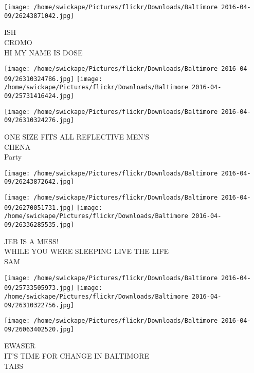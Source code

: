 \documentclass[10pt,letterpaper]{article}
\begin{document}
\vspace{0.25in}
\texttt{[image: /home/swickape/Pictures/flickr/Downloads/Baltimore 2016-04-09/26243871042.jpg]}

ISH\\
CROMO\\
HI MY NAME IS DOSE\\
\pagebreak

\texttt{[image: /home/swickape/Pictures/flickr/Downloads/Baltimore 2016-04-09/26310324786.jpg]}
\texttt{[image: /home/swickape/Pictures/flickr/Downloads/Baltimore 2016-04-09/25731416424.jpg]}

\vspace{0.25in}
\texttt{[image: /home/swickape/Pictures/flickr/Downloads/Baltimore 2016-04-09/26310324276.jpg]}

ONE SIZE FITS ALL REFLECTIVE MEN'S\\
CHENA\\
Party\\
\pagebreak

\texttt{[image: /home/swickape/Pictures/flickr/Downloads/Baltimore 2016-04-09/26243872642.jpg]}

\vspace{0.25in}
\texttt{[image: /home/swickape/Pictures/flickr/Downloads/Baltimore 2016-04-09/26270051731.jpg]}
\texttt{[image: /home/swickape/Pictures/flickr/Downloads/Baltimore 2016-04-09/26336285535.jpg]}

JEB IS A MESS!\\
WHILE YOU WERE SLEEPING LIVE THE LIFE\\
SAM\\
\pagebreak

\texttt{[image: /home/swickape/Pictures/flickr/Downloads/Baltimore 2016-04-09/25733505973.jpg]}
\texttt{[image: /home/swickape/Pictures/flickr/Downloads/Baltimore 2016-04-09/26310322756.jpg]}

\texttt{[image: /home/swickape/Pictures/flickr/Downloads/Baltimore 2016-04-09/26063402520.jpg]}

EWASER\\
IT'S TIME FOR CHANGE IN BALTIMORE\\
TABS\\
\pagebreak
\end{document}
